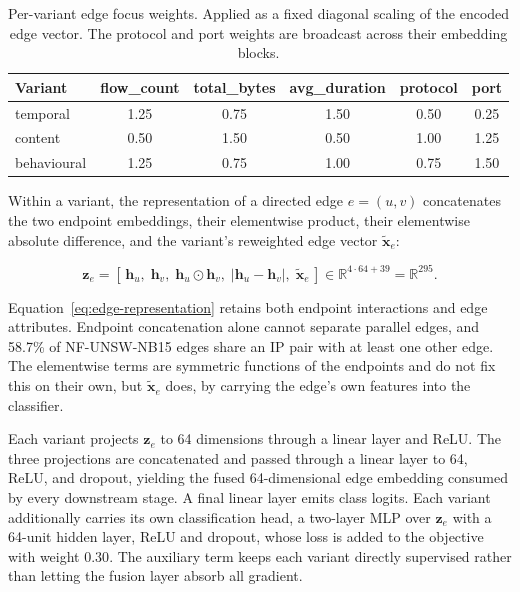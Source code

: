 \begin{table}[t]
\centering
\caption[Per-variant edge focus weights]{Per-variant edge focus weights. Applied as a fixed diagonal scaling of the encoded
edge vector. The protocol and port weights are broadcast across their embedding blocks.}
\label{tab:focus}
\begin{tabular}{lccccc}
\toprule
Variant & flow\_count & total\_bytes & avg\_duration & protocol & port \\
\midrule
temporal    & 1.25 & 0.75 & 1.50 & 0.50 & 0.25 \\
content     & 0.50 & 1.50 & 0.50 & 1.00 & 1.25 \\
behavioural & 1.25 & 0.75 & 1.00 & 0.75 & 1.50 \\
\bottomrule
\end{tabular}
\end{table}

Within a variant, the representation of a directed edge $e = (u,v)$ concatenates the two
endpoint embeddings, their elementwise product, their elementwise absolute difference, and the
variant's reweighted edge vector $\tilde{\mathbf{x}}_{e}$:

\begin{equation}
\label{eq:edge-representation}
\mathbf{z}_{e}
=
\left[\,
\mathbf{h}_{u},\;
\mathbf{h}_{v},\;
\mathbf{h}_{u}\odot\mathbf{h}_{v},\;
\left|\mathbf{h}_{u}-\mathbf{h}_{v}\right|,\;
\tilde{\mathbf{x}}_{e}
\,\right]
\in \mathbb{R}^{4\cdot 64 + 39} = \mathbb{R}^{295}.
\end{equation}

Equation~\eqref{eq:edge-representation} retains both endpoint interactions and edge attributes. Endpoint concatenation alone cannot
separate parallel edges, and 58.7\% of NF-UNSW-NB15 edges share an IP pair with at least one
other edge. The elementwise terms are symmetric functions of the endpoints and do not fix
this on their own, but $\tilde{\mathbf{x}}_{e}$ does, by carrying the edge's own features into
the classifier.

Each variant projects $\mathbf{z}_{e}$ to 64 dimensions through a linear layer and ReLU. The
three projections are concatenated and passed through a linear layer to 64, ReLU, and dropout,
yielding the fused 64-dimensional edge embedding consumed by every downstream stage. A final
linear layer emits class logits. Each variant additionally carries its own classification
head, a two-layer MLP over $\mathbf{z}_{e}$ with a 64-unit hidden layer, ReLU and dropout,
whose loss is added to the objective with weight $0.30$. The auxiliary term keeps each variant
directly supervised rather than letting the fusion layer absorb all gradient.

